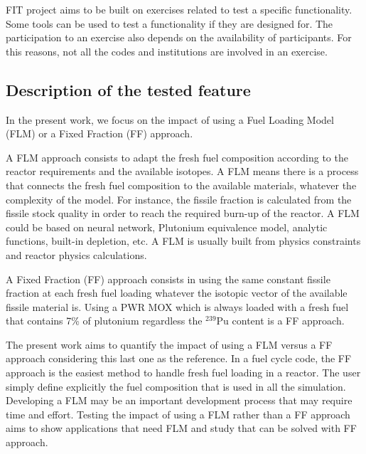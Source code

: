 FIT project aims to be built on exercises related to test a specific functionality. Some tools can be used to test a functionality if they are designed for. The participation to an exercise also depends on the availability of participants. For this reasons, not all the codes and institutions are involved in an exercise.

\subsection{Description of the tested feature}

In the present work, we focus on the impact of using a Fuel Loading Model (FLM) or a Fixed Fraction (FF) approach. 

A FLM approach consists to adapt the fresh fuel composition according to the reactor requirements and the available isotopes. A FLM means there is a process that connects the fresh fuel composition to the available materials, whatever the complexity of the model. For instance, the fissile fraction is calculated from the fissile stock quality in order to reach the required burn-up of the reactor. A FLM could be based on neural network, Plutonium equivalence model, analytic functions, built-in depletion, etc. A FLM is usually built from physics constraints and reactor physics calculations. 

A Fixed Fraction (FF) approach consists in using the same constant fissile fraction at each fresh fuel loading whatever the isotopic vector of the available fissile material is. Using a PWR MOX which is always loaded with a fresh fuel that contains 7\% of plutonium regardless the $^{239}$Pu content is a FF approach. 

The present work aims to quantify the impact of using a FLM versus a FF approach considering this last one as the reference. In a fuel cycle code, the FF approach is the easiest method to handle fresh fuel loading in a reactor. The user simply define explicitly the fuel composition that is used in all the simulation. Developing a FLM may be an important development process that may require time and effort. Testing the impact of using a FLM rather than a FF approach aims to show applications that need FLM and study that can be solved with FF approach.


